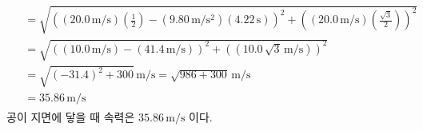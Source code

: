\documentclass[floatfix,nofootinbib,superscriptaddress,fleqn,preprint]{revtex4}
\begin{document}
\begin{itemize}
\begin{align}
\begin{split}
      &=\sqrt{{\left((20.0\,\mathrm{m/s})\left(\frac{1}{2}\right)
      -(9.80\,\mathrm{m/s^2})(4.22\,\mathrm{s})\right)}^2
      +{\left((20.0\,\mathrm{m/s})\left(\frac{\sqrt{3}}{2}\right)\right)}^2}  \\
      &=\sqrt{{\left((10.0\,\mathrm{m/s})
      -(41.4\,\mathrm{m/s})\right)}^2
      +{\left((10.0\,\sqrt{3}\,\mathrm{m/s})\right)}^2} \\
      &=\sqrt{{\left(-31.4\right)}^2
      +300}\,\mathrm{m/s} 
      =\sqrt{986+300}\,\mathrm{m/s}\\
      &=35.86\,\mathrm{m/s}
    \end{split}
  \end{align}
  공이 지면에 닿을 때 속력은 $35.86\,\mathrm{m/s}$ 이다.
\end{itemize}

\vspace{2cm}
\end{document}
